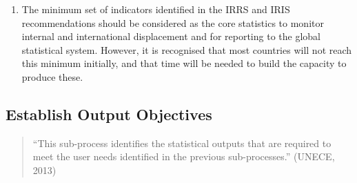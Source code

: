 \documentclass[
]{article}
\begin{document}
\begin{enumerate}
  Transfer of Personal Data of Refugees and Asylum-seekers to
  governments under certain conditions (see Part III \emph{UNHCR Agreements
  and Memoranda of} \emph{Understand}ing). They acknowledge the importance
  of registration as a protection tool and expect States to take
  responsibility for registration as quickly as possible. The sharing
  of data needs to be "\emph{subject to the data protection safeguards as
  contained in UNHCR's Policy on the Protection of Persons of
  Concern}\footnote{\url{https://nsdsguidelines.paris21.org/node/796}}\emph{".} The agreement allows for the \emph{'}compiling
  statistical data' among the allowable purposes for personal data
  transfer. Data may not be transferred to a third party except with
  the prior written authorisation of UNHCR and/or the consent of the
  data subject (the refugee or displaced person). Any third party must
  conform with the conditions set out in the UNHCR data sharing
  agreement. In the case of refugees, the data may not be shared with
  the refugee's country of origin, except under the circumstances of
  voluntary repatriation under the auspices of UNHCR with the consent
  of the individual refugee.
\item
  The minimum set of indicators identified in the IRRS and IRIS
  recommendations should be considered as the core statistics to
  monitor internal and international displacement and for reporting to
  the global statistical system. However, it is recognised that most
  countries will not reach this minimum initially, and that time will
  be needed to build the capacity to produce these.
\end{enumerate}

\hypertarget{establish-output-objectives}{%
\subsection{Establish Output Objectives}\label{establish-output-objectives}}

\begin{quote}
``This sub-process identifies the statistical outputs that are required
to meet the user needs identified in the previous sub-processes.''
(UNECE, 2013)
\end{quote}
\end{document}
